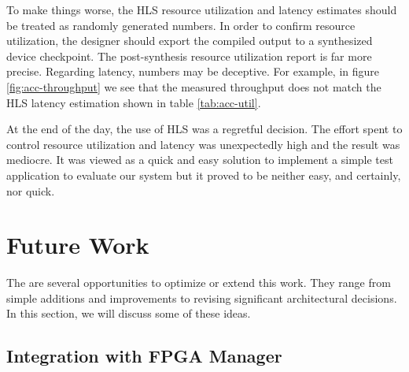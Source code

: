 To make things worse, the HLS resource utilization and latency estimates should be treated as randomly generated numbers.
In order to confirm resource utilization, the designer should export the compiled output to a synthesized device checkpoint.
The post-synthesis resource utilization report is far more precise. Regarding latency, numbers may be deceptive. For example,
in figure \ref{fig:acc-throughput} we see that the measured throughput does not match the HLS latency estimation shown in table \ref{tab:acc-util}.



At the end of the day, the use of HLS was a regretful decision.
The effort spent to control resource utilization and latency was unexpectedly high and the result was mediocre.
It was viewed as a quick and easy solution to implement a simple test application to evaluate our system 
but it proved to be neither easy, and certainly, nor quick.

\section{Future Work}
\label{sec:future}

The are several opportunities to optimize or extend this work.
They range from simple additions and improvements to 
revising significant architectural decisions.
In this section, we will discuss some of these ideas.

\subsection{Integration with FPGA Manager}

